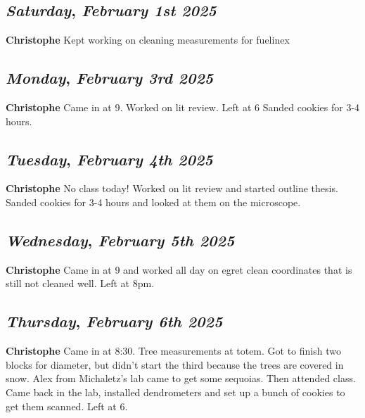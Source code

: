 \begin{center}
\section*{\month}
\end{center}

\def\day{\textit{February 1st 2025}}
\def\weekday{\textit{Saturday}}
\subsection*{\weekday, \day}
\textbf {Christophe}
Kept working on cleaning measurements for fuelinex

\def\day{\textit{February 3rd 2025}}
\def\weekday{\textit{Monday}}
\subsection*{\weekday, \day}
\textbf {Christophe}
Came in at 9. Worked on lit review. Left at 6
Sanded cookies for 3-4 hours.
\def\day{\textit{February 4th 2025}}
\def\weekday{\textit{Tuesday}}
\subsection*{\weekday, \day}
\textbf {Christophe}
No class today! Worked on lit review and started outline thesis.
Sanded cookies for 3-4 hours and looked at them on the microscope.

\def\day{\textit{February 5th 2025}}
\def\weekday{\textit{Wednesday}}
\subsection*{\weekday, \day}
\textbf {Christophe}
Came in at 9 and worked all day on egret clean coordinates that is still not cleaned well. Left at 8pm.

\def\day{\textit{February 6th 2025}}
\def\weekday{\textit{Thursday}}
\subsection*{\weekday, \day}
\textbf {Christophe}
Came in at 8:30. Tree measurements at totem. Got to finish two blocks for diameter, but didn't start the third because the trees are covered in snow. Alex from Michaletz's lab came to get some sequoias. Then attended class. Came back in the lab, installed dendrometers and set up a bunch of cookies to get them scanned. Left at 6.

\def\day{\textit{February 10th 2025}}
\def\weekday{\textit{Monday}}
